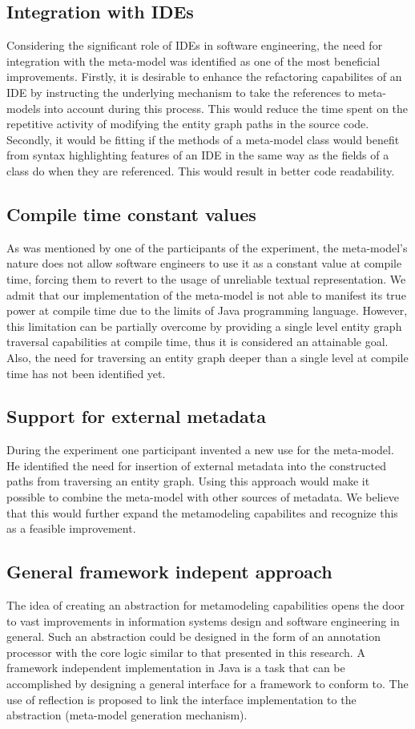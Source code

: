 \subsection{Integration with IDEs}
Considering the significant role of IDEs in software engineering, the need for integration with the meta-model was identified as one of the most beneficial improvements.
Firstly, it is desirable to enhance the refactoring capabilites of an IDE by instructing the underlying mechanism to take the references to meta-models into account during this process.
This would reduce the time spent on the repetitive activity of modifying the entity graph paths in the source code.
Secondly, it would be fitting if the methods of a meta-model class would benefit from syntax highlighting features of an IDE in the same way as the fields of a class do when they are referenced.
This would result in better code readability.

\subsection{Compile time constant values}
As was mentioned by one of the participants of the experiment, the meta-model's nature does not allow software engineers to use it as a constant value at compile time, forcing them to revert to the usage of unreliable textual representation.
We admit that our implementation of the meta-model is not able to manifest its true power at compile time due to the limits of Java programming language.
However, this limitation can be partially overcome by providing a single level entity graph traversal capabilities at compile time, thus it is considered an attainable goal.
Also, the need for traversing an entity graph deeper than a single level at compile time has not been identified yet.

\subsection{Support for external metadata}
During the experiment one participant invented a new use for the meta-model.
He identified the need for insertion of external metadata into the constructed paths from traversing an entity graph.
Using this approach would make it possible to combine the meta-model with other sources of metadata.
We believe that this would further expand the metamodeling capabilites and recognize this as a feasible improvement.

\subsection{General framework indepent approach}
The idea of creating an abstraction for metamodeling capabilities opens the door to vast improvements in information systems design and software engineering in general.
Such an abstraction could be designed in the form of an annotation processor with the core logic similar to that presented in this research.
A framework independent implementation in Java is a task that can be accomplished by designing a general interface for a framework to conform to.
The use of reflection is proposed to link the interface implementation to the abstraction (meta-model generation mechanism).

